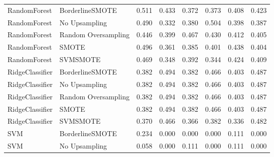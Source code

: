 \begin{tabular}{llllllll}
                RandomForest &     BorderlineSMOTE & 0.511 &                     0.433 &                 0.372 &                  0.373 &                                   0.408 &    0.423 \\
                RandomForest &       No Upsampling & 0.490 &                     0.332 &                 0.380 &                  0.504 &                                   0.398 &    0.387 \\
                RandomForest & Random Oversampling & 0.446 &                     0.399 &                 0.467 &                  0.430 &                                   0.412 &    0.405 \\
                RandomForest &               SMOTE & 0.496 &                     0.361 &                 0.385 &                  0.401 &                                   0.438 &    0.404 \\
                RandomForest &            SVMSMOTE & 0.469 &                     0.348 &                 0.392 &                  0.344 &                                   0.424 &    0.409 \\
             RidgeClassifier &     BorderlineSMOTE & 0.382 &                     0.494 &                 0.382 &                  0.466 &                                   0.403 &    0.487 \\
             RidgeClassifier &       No Upsampling & 0.382 &                     0.494 &                 0.382 &                  0.466 &                                   0.403 &    0.487 \\
             RidgeClassifier & Random Oversampling & 0.382 &                     0.494 &                 0.382 &                  0.466 &                                   0.403 &    0.487 \\
             RidgeClassifier &               SMOTE & 0.382 &                     0.494 &                 0.382 &                  0.466 &                                   0.403 &    0.487 \\
             RidgeClassifier &            SVMSMOTE & 0.370 &                     0.466 &                 0.366 &                  0.382 &                                   0.336 &    0.482 \\
                         SVM &     BorderlineSMOTE & 0.234 &                     0.000 &                 0.000 &                  0.000 &                                   0.111 &    0.000 \\
                         SVM &       No Upsampling & 0.058 &                     0.000 &                 0.111 &                  0.000 &                                   0.111 &    0.000 \\

\end{tabular}
